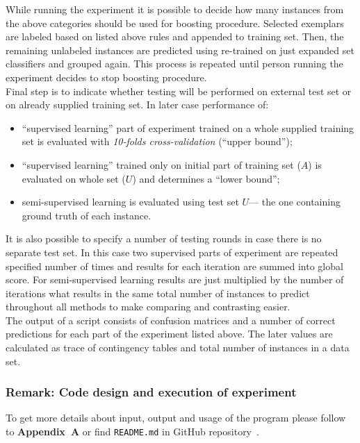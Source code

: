 \documentclass[12pt, a4paper, pdflatex]{report}
\begin{document}
While running the experiment it is possible to decide how many instances from the above categories should be used for boosting procedure. Selected exemplars are labeled based on listed above rules and appended to training set. Then, the remaining unlabeled instances are predicted using re-trained on just expanded set classifiers and grouped again. This process is repeated until person running the experiment decides to stop boosting procedure.\\

Final step is to indicate whether testing will be performed on external test set or on already supplied training set. 
In later case performance of:
\begin{itemize}
\item ``supervised learning'' part of experiment trained on a whole supplied training set is evaluated with \emph{10-folds cross-validation} (``upper bound'');
\item ``supervised learning'' trained only on initial part of training set ($A$) is evaluated on whole set ($U$) and determines a ``lower bound'';
\item semi-supervised learning is evaluated using test set $U$--- the one containing ground truth of each instance.
\end{itemize}

It is also possible to specify a number of testing rounds in case there is no separate test set. In this case two supervised parts of experiment are repeated specified number of times and results for each iteration are summed into global score. For semi-supervised learning results are just multiplied by the number of iterations what results in the same total number of instances to predict throughout all methods to make comparing and contrasting easier.\\

The output of a script consists of confusion matrices and a number of correct predictions for each part of the experiment listed above. The later values are calculated as trace of contingency tables and total number of instances in a data set.

\subsubsection{Remark: Code design and execution of experiment}
To get more details about input, output and usage of the program please follow to \textbf{Appendix~A} or find \texttt{README.md} in GitHub repository~\cite{githubcode}.
\end{document}
